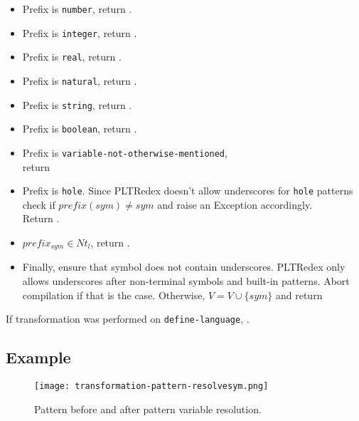 \begin{itemize}
\item Prefix is \texttt{number}, return .
\item Prefix is \texttt{integer}, return .
\item Prefix is \texttt{real}, return .
\item Prefix is \texttt{natural}, return .
\item Prefix is \texttt{string}, return .
\item Prefix is \texttt{boolean}, return .
\item Prefix is \texttt{variable-not-otherwise-mentioned}, \\ return 
\item Prefix is \texttt{hole}. Since PLTRedex doesn't allow underscores for \texttt{hole} patterns check if $\mathit{prefix(sym) \neq sym}$ and raise an Exception accordingly. \\ Return .
\item $\mathit{prefix_{sym} \in Nt_l}$, return .
\item Finally, ensure that symbol does not contain underscores. PLTRedex only allows underscores after non-terminal symbols and built-in patterns. Abort compilation if that is the case. Otherwise, $V=V\cup\{\mathit{sym}\}$ and return 
\end{itemize}
If transformation was performed on \texttt{define-language}, .

\subsection{Example}

\begin{figure}[H]
\texttt{[image: transformation-pattern-resolvesym.png]}
\caption{Pattern before and after pattern variable resolution.}
\label{transformation-pattern-resolvesym}
\end{figure}

